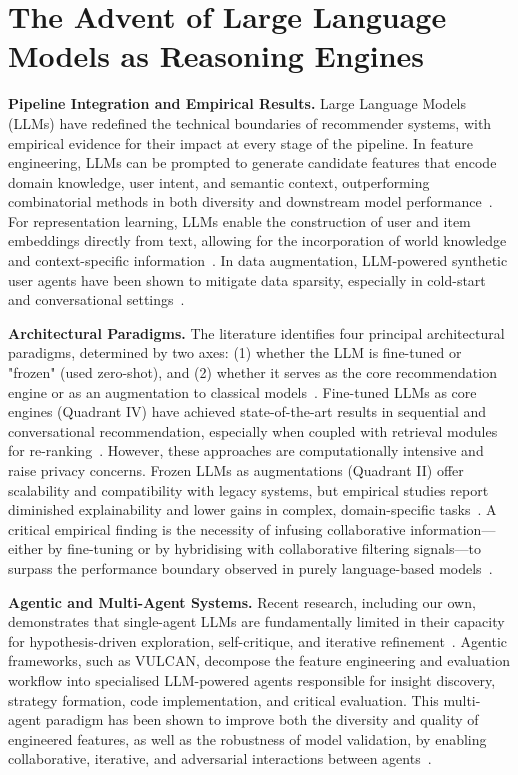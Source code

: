\section{The Advent of Large Language Models as Reasoning Engines}
\label{sec:intro_llms}

\textbf{Pipeline Integration and Empirical Results.} Large Language Models (LLMs) have redefined the technical boundaries of recommender systems, with empirical evidence for their impact at every stage of the pipeline. In feature engineering, LLMs can be prompted to generate candidate features that encode domain knowledge, user intent, and semantic context, outperforming combinatorial methods in both diversity and downstream model performance~\cite{Zou2025FEBP, Wang2023LLMAgentsSurvey}. For representation learning, LLMs enable the construction of user and item embeddings directly from text, allowing for the incorporation of world knowledge and context-specific information~\cite{Qiu2021UBERT, Wang2024RecMind}. In data augmentation, LLM-powered synthetic user agents have been shown to mitigate data sparsity, especially in cold-start and conversational settings~\cite{Mysore2023NarrativeDriven, Wang2024RecMind}.

\textbf{Architectural Paradigms.} The literature identifies four principal architectural paradigms, determined by two axes: (1) whether the LLM is fine-tuned or "frozen" (used zero-shot), and (2) whether it serves as the core recommendation engine or as an augmentation to classical models~\cite{Lin2024Survey, Xu2024Prompting}. Fine-tuned LLMs as core engines (Quadrant IV) have achieved state-of-the-art results in sequential and conversational recommendation, especially when coupled with retrieval modules for re-ranking~\cite{Cao2024Aligning}. However, these approaches are computationally intensive and raise privacy concerns. Frozen LLMs as augmentations (Quadrant II) offer scalability and compatibility with legacy systems, but empirical studies report diminished explainability and lower gains in complex, domain-specific tasks~\cite{Qiu2021UBERT, Lin2024Survey}. A critical empirical finding is the necessity of infusing collaborative information—either by fine-tuning or by hybridising with collaborative filtering signals—to surpass the performance boundary observed in purely language-based models~\cite{Lin2024Survey, Zhang2023AgentCF}.

\textbf{Agentic and Multi-Agent Systems.} Recent research, including our own, demonstrates that single-agent LLMs are fundamentally limited in their capacity for hypothesis-driven exploration, self-critique, and iterative refinement~\cite{Zhang2023AgentCF, Wang2023LLMAgentsSurvey}. Agentic frameworks, such as VULCAN, decompose the feature engineering and evaluation workflow into specialised LLM-powered agents responsible for insight discovery, strategy formation, code implementation, and critical evaluation. This multi-agent paradigm has been shown to improve both the diversity and quality of engineered features, as well as the robustness of model validation, by enabling collaborative, iterative, and adversarial interactions between agents~\cite{Zhang2023AgentCF, Wang2024RecMind}.

